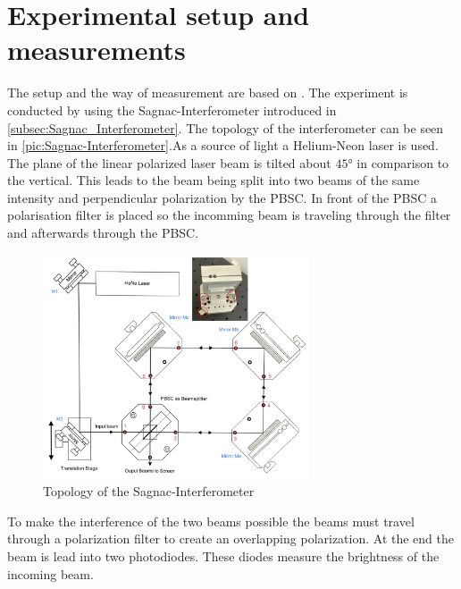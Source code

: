 \section{Experimental setup and measurements}
The setup and the way of measurement are based on \cite{anleitungV64}.
\label{sec:Experimentale}
The experiment is conducted by using the Sagnac-Interferometer introduced in \ref{subsec:Sagnac_Interferometer}. 
The topology of the interferometer can be seen in \autoref{pic:Sagnac-Interferometer}.As a 
source of light a Helium-Neon laser is used. The plane of the linear polarized laser beam is tilted about $45°$ in comparison to 
the vertical. This leads to the beam being split into two beams of the same intensity and perpendicular polarization by the PBSC.
In front of the PBSC a polarisation filter is placed so the incomming beam is traveling through the filter and afterwards through the 
PBSC. 

\begin{figure}
    \centering
    \includegraphics[width=0.70\textwidth]{content/Bilder/Sagnac_Interferometer.jpeg}
    \caption{Topology of the Sagnac-Interferometer \cite{anleitungV64}}
    \label{pic:Sagnac-Interferometer}
  \end{figure}

To make the interference of the two beams possible the beams must travel through a polarization filter to create an overlapping polarization. 
At the end the beam is lead into two photodiodes. These diodes measure the brightness of the incoming beam. 

